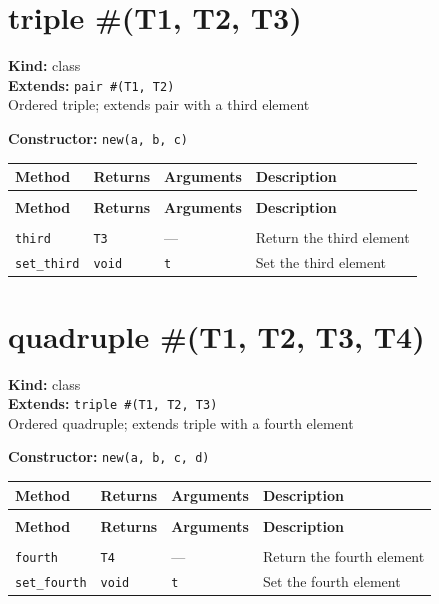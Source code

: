 \documentclass[11pt,letterpaper]{report}
\begin{document}
\section{triple \#(T1, T2, T3)}
\label{cls:tripleT1T2T3}

\noindent\textbf{Kind:} class\\
\noindent\textbf{Extends:} \texttt{pair \#(T1, T2)}\\
\noindent Ordered triple; extends pair with a third element

\noindent\textbf{Constructor:} \texttt{new(a, b, c)}

\begin{xltabular}{\linewidth}{>{\small}p{1.35in} >{\small}p{1.25in} >{\small}p{0.95in} >{\small}X}
\toprule
\textbf{Method} & \textbf{Returns} & \textbf{Arguments} & \textbf{Description} \\
\midrule
\endfirsthead
{} \\
\midrule
\textbf{Method} & \textbf{Returns} & \textbf{Arguments} & \textbf{Description} \\
\midrule
\endhead
\midrule
{} \\
\endfoot
\bottomrule
\endlastfoot
\texttt{third} & \texttt{T3} & --- & Return the third element \\
\texttt{set\_third} & \texttt{void} & \texttt{t} & Set the third element \\
\end{xltabular}

\section{quadruple \#(T1, T2, T3, T4)}
\label{cls:quadrupleT1T2T3T4}

\noindent\textbf{Kind:} class\\
\noindent\textbf{Extends:} \texttt{triple \#(T1, T2, T3)}\\
\noindent Ordered quadruple; extends triple with a fourth element

\noindent\textbf{Constructor:} \texttt{new(a, b, c, d)}

\begin{xltabular}{\linewidth}{>{\small}p{1.35in} >{\small}p{1.25in} >{\small}p{0.95in} >{\small}X}
\toprule
\textbf{Method} & \textbf{Returns} & \textbf{Arguments} & \textbf{Description} \\
\midrule
\endfirsthead
{} \\
\midrule
\textbf{Method} & \textbf{Returns} & \textbf{Arguments} & \textbf{Description} \\
\midrule
\endhead
\midrule
{} \\
\endfoot
\bottomrule
\endlastfoot
\texttt{fourth} & \texttt{T4} & --- & Return the fourth element \\
\texttt{set\_fourth} & \texttt{void} & \texttt{t} & Set the fourth element \\
\end{xltabular}
\end{document}
